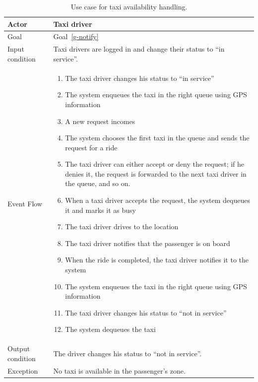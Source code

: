 \begin{table}
\begin{center}
\begin{tabular}{| l | p{} |}
\hline
Actor & Taxi driver \\
\hline
Goal & Goal~\ref{g-notify}
\\
\hline
Input condition & Taxi drivers are logged in and change their status to ``in service''.  \\
\hline
Event Flow & \begin{enumerate}
	\item The taxi driver changes his status to ``in service''
	\item The system enqueues the taxi in the right queue using GPS information
	\item A new request incomes
	\item The system chooses the first taxi in the queue and sends the request for a ride
	\item The taxi driver can either accept or deny the request; if he denies it, the request is forwarded to the next taxi driver in the queue, and so on.
	\item When a taxi driver accepts the request, the system dequeues it and marks it as busy
	\item The taxi driver drives to the location
	\item The taxi driver notifies that the passenger is on board
	\item When the ride is completed, the taxi driver notifies it to the system
	\item The system enqueues the taxi in the right queue using GPS information
	\item The taxi driver changes his status to ``not in service''
	\item The system dequeues the taxi
\end{enumerate}
\\
\hline
Output condition & The driver changes his status to ``not in service''. \\
\hline
Exception & No taxi is available in the passenger's zone. \\
\hline
\end{tabular}
\end{center}
\caption{Use case for taxi availability handling.}
\label{usecase-taxiavailability}
\end{table}

